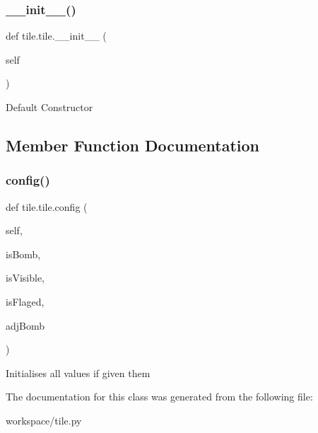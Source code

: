 \subsubsection{\texorpdfstring{\+\_\+\+\_\+init\+\_\+\+\_\+()}{\_\_init\_\_()}}
{\footnotesize\ttfamily def tile.\+tile.\+\_\+\+\_\+init\+\_\+\+\_\+ (\begin{DoxyParamCaption}\item[{}]{self }\end{DoxyParamCaption})}

\begin{DoxyVerb}Default Constructor\end{DoxyVerb}
 

\subsection{Member Function Documentation}
\mbox{\label{classtile_1_1tile_ad7054ecde560f0a41204a149c806e351}} 
\subsubsection{\texorpdfstring{config()}{config()}}
{\footnotesize\ttfamily def tile.\+tile.\+config (\begin{DoxyParamCaption}\item[{}]{self,  }\item[{}]{is\+Bomb,  }\item[{}]{is\+Visible,  }\item[{}]{is\+Flaged,  }\item[{}]{adj\+Bomb }\end{DoxyParamCaption})}

\begin{DoxyVerb}Initialises all values if given them\end{DoxyVerb}
 

The documentation for this class was generated from the following file\+:\begin{DoxyCompactItemize}
\item 
workspace/tile.\+py\end{DoxyCompactItemize}
